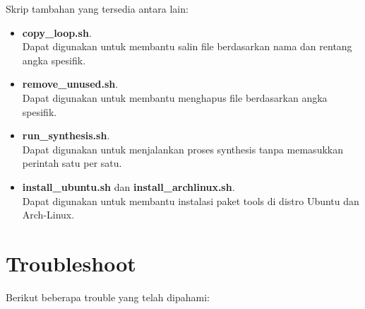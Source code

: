 \documentclass[12pt,]{article}
\begin{document}
	Skrip tambahan yang tersedia antara lain:
	\begin{itemize}
		\item \textbf{copy\_loop.sh}.\\
		Dapat digunakan untuk membantu salin file berdasarkan nama dan rentang angka spesifik.
		
		\item \textbf{remove\_unused.sh}.\\
		Dapat digunakan untuk membantu menghapus file berdasarkan angka spesifik.
		
		\item \textbf{run\_synthesis.sh}.\\
		Dapat digunakan untuk menjalankan proses synthesis tanpa memasukkan perintah satu per satu.
		
		\item \textbf{install\_ubuntu.sh} dan \textbf{install\_archlinux.sh}.\\
		Dapat digunakan untuk membantu instalasi paket tools di distro Ubuntu dan Arch-Linux.
	\end{itemize}
	
	\newpage
	\section{Troubleshoot}
	Berikut beberapa trouble yang telah dipahami:
	
\end{document}
